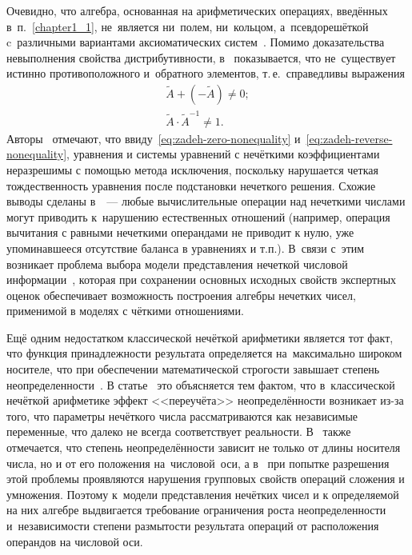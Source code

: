 Очевидно, что алгебра, основанная на арифметических операциях, введённых в~п.~\ref{chapter1_1}, не~является ни~полем, ни~кольцом, а~псевдорешёткой~\cite{Kaufmann, Fuzzy_Lattices} c~различными вариантами аксиоматических систем~\cite{Axioms_Fuzzy_Algebra, Philosophy_Fuzzy_Structures}. Помимо доказательства невыполнения свойства дистрибутивности, в~\cite{Pospelov, Borisov_Alexeev_Msk, Yakhyaeva, Yager_Arithmetics} показывается, что не~существует истинно противоположного и~обратного элементов, т.\,е.~справедливы выражения
\begin{gather}
	\label{eq:zadeh-zero-nonequality}
	\tilde{A}+\left( -\tilde{A} \right)\ne 0; \\
	\label{eq:zadeh-reverse-nonequality}
	\tilde{A}\cdot {{\tilde{A}}^{-1}}\ne 1.
\end{gather}
Авторы~\cite{Rutkovskaya} отмечают, что ввиду~\eqref{eq:zadeh-zero-nonequality} и~\eqref{eq:zadeh-reverse-nonequality}, уравнения и системы уравнений с нечёткими коэффициентами неразрешимы с помощью метода исключения, поскольку нарушается четкая тождественность уравнения после подстановки нечеткого решения. Схожие выводы сделаны в~\cite{Sokolov, Bocharnkinov_Ukraine}~--- любые вычислительные операции над нечеткими числами могут приводить к~нарушению естественных отношений (например, операция вычитания с равными нечеткими операндами не приводит к нулю, уже упоминавшееся отсутствие баланса в уравнениях и т.п.). В~связи с~этим возникает проблема выбора модели представления нечеткой числовой информации~\cite{Koroteev_Fuzzy_Arithmetics}, которая при сохранении основных исходных свойств экспертных оценок обеспечивает возможность построения алгебры нечетких чисел, применимой в моделях с чёткими отношениями. 

Ещё одним недостатком классической нечёткой арифметики является тот факт, что функция принадлежности результата определяется 
на~максимально широком носителе, что при обеспечении математической строгости завышает степень неопределенности~\cite{Evdokimov, Kreinovich_100plus1, Hanss_Engineering}. В статье~\cite{Hanss_Strict_Arithmetic} это объясняется тем фактом, что в~классической нечёткой арифметике эффект <<переучёта>> неопределённости возникает из-за того, что параметры нечёткого числа рассматриваются как независимые переменные, что далеко не всегда соответствует реальности. В~\cite{Yakhyaeva} также отмечается, что степень неопределённости зависит не только от длины носителя числа, но и от его положения на~числовой~оси, а в~\cite{Kreinovich_100plus1} при попытке разрешения этой проблемы проявляются нарушения групповых свойств операций сложения и умножения. Поэтому к~модели представления нечётких чисел и к определяемой на них алгебре выдвигается требование ограничения роста неопределенности и~независимости степени размытости результата операций от расположения операндов на числовой оси.

